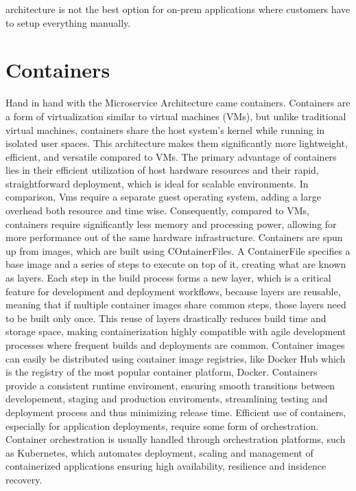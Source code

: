 architecture is not the best option for on-prem applications where customers have to setup everything manually.\cite{whenmicroarebad}

\section{Containers}

Hand in hand with the Microservice Architecture came containers. Containers are a form of virtualization similar to virtual machines (VMs), but unlike traditional virtual machines, containers share the host system's kernel while running in isolated user spaces. This architecture makes them significantly more lightweight, efficient, and versatile compared to VMs. The primary advantage of containers lies in their efficient utilization of host hardware resources and their rapid, straightforward deployment, which is ideal for scalable environments. In comparison, Vms require a separate guest operating system, adding a large overhead both resource and time wise. Consequently, compared to VMs, containers require significantly less memory and processing power, allowing for more performance out of the same hardware infrastructure.\cite{Pahl2015} Containers are spun up from images, which are built using COntainerFiles. A ContainerFile specifies a base image and a series of steps to execute on top of it, creating what are known as layers. Each step in the build process forms a new layer, which is a critical feature for development and deployment workflows, because layers are reusable, meaning that if multiple container images share common steps, those layers need to be built only once. This reuse of layers drastically reduces build time and storage space, making containerization highly compatible with agile development processes where frequent builds and deployments are common. Container images can easily be distributed using container image registries, like Docker Hub which is the registry of the most popular container platform, Docker. Containers provide a consistent runtime enviroment, ensuring smooth transitions between developement, staging and production enviroments, streamlining testing and deployment process and thus minimizing release time. Efficient use of containers, especially for application deployments, require some form of orchestration. Container orchestration is usually handled through orchestration platforms, such as Kubernetes, which automates deployment, scaling and management of containerized applications ensuring high availability, resilience and insidence recovery.\cite{dockerDev}

